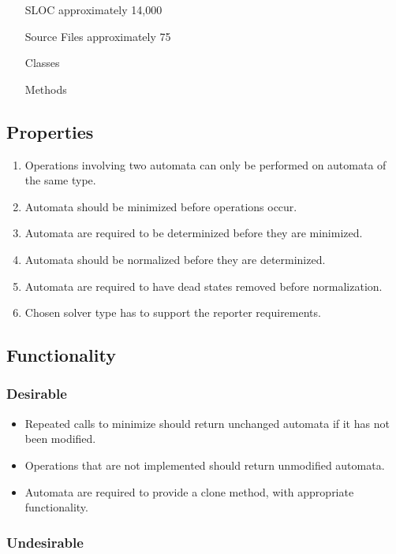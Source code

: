 \documentclass[letterpaper,11pt]{article}
\begin{document}
\begin{itemize}
\item[SLOC]{approximately 14,000}
\item[Source Files]{approximately 75}
\item[Classes]{}
\item[Methods]{}
\end{itemize}

\subsection{Properties}

\begin{enumerate}
\item{Operations involving two automata can only be performed on automata of
    the same type.}
\item{Automata should be minimized before operations occur.}
\item{Automata are required to be determinized before they are minimized.}
\item{Automata should be normalized before they are determinized.}
\item{Automata are required to have dead states removed before normalization.}
\item{Chosen solver type has to support the reporter requirements.}
\end{enumerate}

\subsection{Functionality}

\subsubsection{Desirable}

\begin{itemize}
\item{Repeated calls to minimize should return unchanged automata if it has not
    been modified.}
\item{Operations that are not implemented should return unmodified automata.}
\item{Automata are required to provide a clone method, with appropriate
    functionality.}
\end{itemize}
\subsubsection{Undesirable}

\nocite{*}


\end{document}
